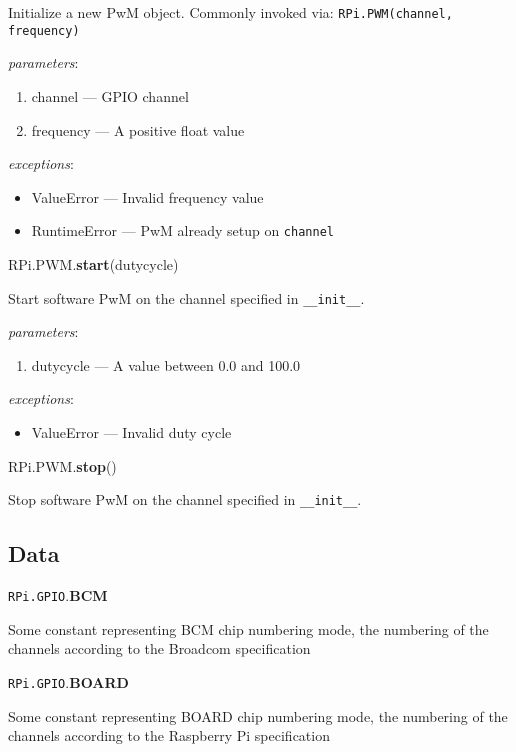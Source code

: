 \documentclass[12pt]{article}
\begin{document}
Initialize a new PwM object. Commonly invoked via: \texttt{RPi.PWM(channel, frequency)}

\textit{parameters}:
\begin{enumerate}
        \item channel --- GPIO channel
        \item frequency --- A positive float value
\end{enumerate}
 
 
\textit{exceptions}:
\begin{itemize}
    \item ValueError --- Invalid frequency value
    \item RuntimeError --- PwM already setup on \texttt{channel}
\end{itemize}

\noindent RPi.PWM.\textbf{start}(dutycycle)
        
Start software PwM on the channel specified in \texttt{\_\_init\_\_}.

\textit{parameters}:
\begin{enumerate}      
        \item dutycycle --- A value between 0.0 and 100.0
\end{enumerate}
 
 
\textit{exceptions}:
\begin{itemize}
    \item ValueError --- Invalid duty cycle
\end{itemize}

\noindent RPi.PWM.\textbf{stop}()
        
Stop software PwM on the channel specified in \texttt{\_\_init\_\_}.

\medskip \medskip

\subsection{Data}

\noindent \texttt{RPi.GPIO}.\textbf{BCM}

Some constant representing BCM chip numbering mode, the numbering of the channels according to the Broadcom specification

\noindent \texttt{RPi.GPIO}.\textbf{BOARD}

Some constant representing BOARD chip numbering mode, the numbering of the channels according to the Raspberry Pi specification
\end{document}
